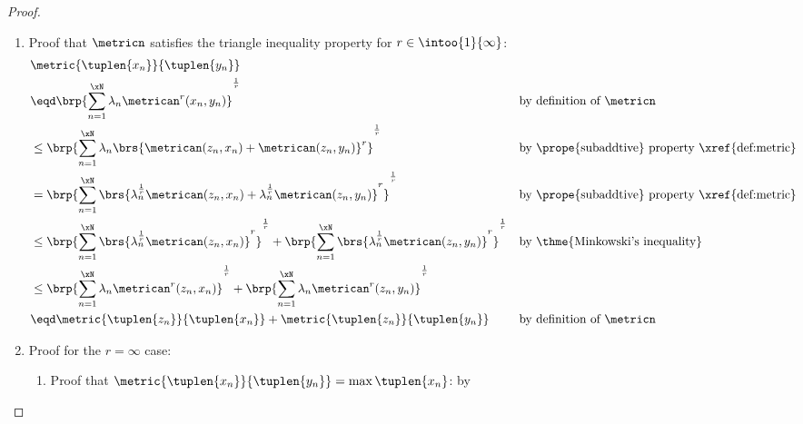 \begin{proof}
\begin{enumerate}
  \item Proof that $\metricn$ satisfies the triangle inequality property  for $r\in\intoo{1}{\infty}$:
    \begin{align*}
      &\metric{\tuplen{x_n}}{\tuplen{y_n}}
      \\&\eqd \brp{\sum_{n=1}^\xN \lambda_n \metrican^r(x_n,y_n)}^\frac{1}{r}
        &&    \text{by definition of $\metricn$}
      \\&\leq \brp{\sum_{n=1}^\xN \lambda_n \brs{\metrican(z_n,x_n)+\metrican(z_n,y_n)}^r}^\frac{1}{r}
        &&    \text{by \prope{subaddtive} property \xref{def:metric}}
      \\&=    \brp{\sum_{n=1}^\xN \brs{\lambda_n^\frac{1}{r} \metrican(z_n,x_n)+\lambda_n^\frac{1}{r}\metrican(z_n,y_n)}^r}^\frac{1}{r}
        &&    \text{by \prope{subaddtive} property \xref{def:metric}}
      \\&\leq \brp{\sum_{n=1}^\xN \brs{\lambda_n^\frac{1}{r}\metrican(z_n,x_n)}^r}^\frac{1}{r} 
            + \brp{\sum_{n=1}^\xN \brs{\lambda_n^\frac{1}{r}\metrican(z_n,y_n)}^r}^\frac{1}{r}
        &&    \text{by \thme{Minkowski's inequality}} %
      \\&\leq \brp{\sum_{n=1}^\xN \lambda_n \metrican^r(z_n,x_n)}^\frac{1}{r} 
            + \brp{\sum_{n=1}^\xN \lambda_n \metrican^r(z_n,y_n)}^\frac{1}{r}
      \\&\eqd \metric{\tuplen{z_n}}{\tuplen{x_n}} + \metric{\tuplen{z_n}}{\tuplen{y_n}}
        &&    \text{by definition of $\metricn$}
    \end{align*}

  \item Proof for the $r=\infty$ case:
    \begin{enumerate}
      \item Proof that $\metric{\tuplen{x_n}}{\tuplen{y_n}} = \max\tuplen{x_n}$: by 
      

\end{enumerate}
\end{enumerate}
\end{proof}
